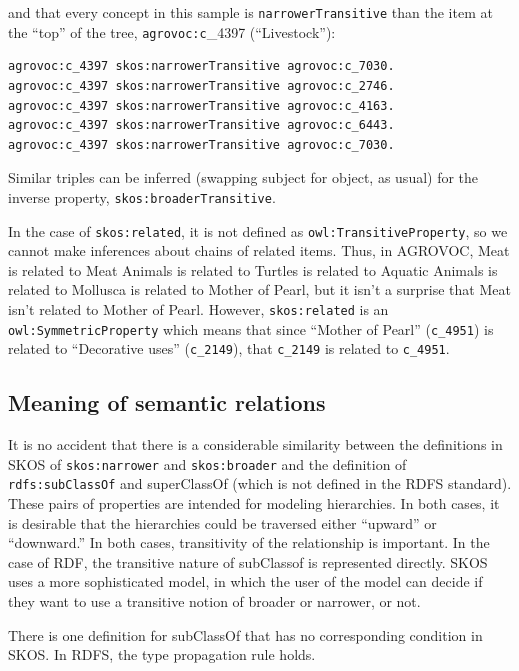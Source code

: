 and that every concept in this sample is \texttt{narrowerTransitive} than the
item at the ``top'' of the tree, \texttt{agrovoc:c}\_4397 (``Livestock''):

\begin{lstlisting}
agrovoc:c_4397 skos:narrowerTransitive agrovoc:c_7030.
agrovoc:c_4397 skos:narrowerTransitive agrovoc:c_2746.
agrovoc:c_4397 skos:narrowerTransitive agrovoc:c_4163.
agrovoc:c_4397 skos:narrowerTransitive agrovoc:c_6443.
agrovoc:c_4397 skos:narrowerTransitive agrovoc:c_7030.
\end{lstlisting}

Similar triples can be inferred (swapping subject for object, as usual)
for the inverse property,
\texttt{skos:broaderTransitive}.

In the case of \texttt{skos:related}, it is not defined as
\texttt{owl:TransitiveProperty}, so we cannot make inferences about chains of
related items. Thus, in AGROVOC, Meat is related to Meat Animals is
related to Turtles is related to Aquatic Animals is related to Mollusca
is related to Mother of Pearl, but it isn't a surprise that Meat isn't
related to Mother of Pearl. However, \texttt{skos:related} is an
\texttt{owl:SymmetricProperty} which means that since ``Mother of Pearl''
(\texttt{c\_4951}) is related to ``Decorative uses'' (\texttt{c\_2149}), that \texttt{c\_2149} is
related to \texttt{c\_4951}.

\subsection{Meaning of semantic relations}
\label{ch11.semrel}
It is no accident that there is a considerable similarity between the
definitions in SKOS of \texttt{skos:narrower} and \texttt{skos:broader} and the definition
of \texttt{rdfs:subClassOf} and superClassOf (which is not defined in the RDFS
standard). These pairs of properties are intended for modeling
hierarchies. In both cases, it is desirable that the hierarchies could
be traversed either ``upward'' or ``downward.'' In both cases,
transitivity of the relationship is important. In the case of RDF, the
transitive nature of subClassof is represented directly. SKOS uses a
more sophisticated model, in which the user of the model can decide if
they want to use a transitive notion of broader or narrower, or not.

There is one definition for subClassOf that has no corresponding
condition in SKOS. In RDFS, the type propagation rule holds.

